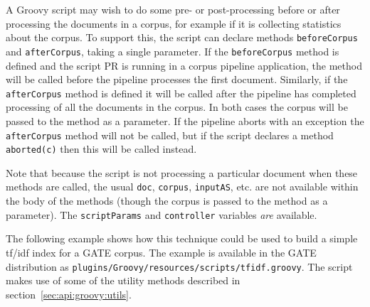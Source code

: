 
A Groovy script may wish to do some pre- or post-processing before or after
processing the documents in a corpus, for example if it is collecting
statistics about the corpus.  To support this, the script can declare methods
{\tt beforeCorpus} and {\tt afterCorpus}, taking a single parameter.  If the
{\tt beforeCorpus} method is defined and the script PR is running in a corpus
pipeline application, the method will be called before the pipeline processes
the first document.  Similarly, if the {\tt afterCorpus} method is defined it
will be called after the pipeline has completed processing of all the documents
in the corpus.  In both cases the corpus will be passed to the method as a
parameter.  If the pipeline aborts with an exception the {\tt afterCorpus}
method will not be called, but if the script declares a method {\tt aborted(c)}
then this will be called instead.

Note that because the script is not processing a particular document when these
methods are called, the usual {\tt doc}, {\tt corpus}, {\tt inputAS}, etc. are
not available within the body of the methods (though the corpus is passed to
the method as a parameter).  The {\tt scriptParams} and {\tt controller} 
variables \emph{are} available.

The following example shows how this technique could be used to build a simple
tf/idf index for a GATE corpus.  The example is available in the GATE
distribution as {\tt plugins/Groovy/resources/scripts/tfidf.groovy}.  The
script makes use of some of the utility methods described in
section~\ref{sec:api:groovy:utils}.

